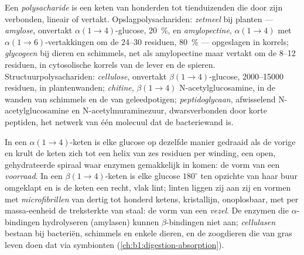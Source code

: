 \begin{definition}[Polysacharide]\label{def:b1:carbohydrates:polysaccharide}
Een \emph{polysacharide} is een keten van honderden tot
tienduizenden  die door  zijn verbonden, lineair
of vertakt. Opslagpolysachariden: \emph{zetmeel} bij planten ---
\emph{amylose}, onvertakt $\alpha(1{\to}4)$-glucose, \qty{20}{\%}, en
\emph{amylopectine}, $\alpha(1{\to}4)$ met $\alpha(1{\to}6)$-vertakkingen om de
\qtyrange{24}{30}{} residuen, \qty{80}{\%} --- opgeslagen in korrels;
\emph{glycogeen} bij dieren en schimmels, net als amylopectine
maar vertakt om de \qtyrange{8}{12}{} residuen, in cytosolische korrels van de
lever en de spieren. Structuurpolysachariden: \emph{cellulose},
onvertakt $\beta(1{\to}4)$-glucose, \qtyrange{2000}{15000}{} residuen, in
plantenwanden; \emph{chitine}, $\beta(1{\to}4)$
N-acetylglucosamine, in de wanden van schimmels en de  van geleedpotigen;
\emph{peptidoglycaan}, afwisselend N-acetylglucosamine en
N-acetylmuraminezuur, dwarsverbonden door korte peptiden, het netwerk van één
molecuul dat de bacteriewand is.
\end{definition}

\begin{proposition}\label{prop:b1:carbohydrates:alphabeta}
In een $\alpha(1{\to}4)$-keten is elke glucose op dezelfde manier gedraaid als de
vorige en krult de keten zich tot een helix van zes residuen per winding, een
open, gehydrateerde spiraal waar enzymen gemakkelijk in komen: de vorm van een
\emph{voorraad}. In een $\beta(1{\to}4)$-keten is elke glucose $180^\circ$ ten
opzichte van haar buur omgeklapt en is de keten een recht, vlak lint; linten
liggen zij aan zij en vormen met  \emph{microfibrillen} van
dertig tot honderd ketens, kristallijn, onoplosbaar, met per massa-eenheid de
treksterkte van staal: de vorm van een \emph{vezel}. De enzymen die
$\alpha$-bindingen hydrolyseren (amylasen) kunnen $\beta$-bindingen niet aan;
\emph{cellulasen} bestaan bij bacteriën, schimmels en enkele dieren, en de
zoogdieren die van gras leven doen dat via symbionten
(\cref{ch:b1:digestion-absorption}).
\end{proposition}

